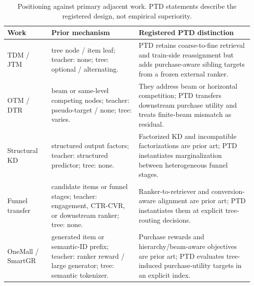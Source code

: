 \begin{table}[!t]
\caption{Positioning against primary adjacent work. PTD statements describe the registered design, not empirical superiority.}
\label{tab:related}
\small
\begin{tabularx}{\textwidth}{l X X}
\toprule
Work & Prior mechanism & Registered PTD distinction \\
\midrule
TDM / JTM~\cite{zhu2018tdm,zhu2019jtm} & tree node / item leaf; teacher: none; tree: optional / alternating. & PTD retains coarse-to-fine retrieval and train-side reassignment but adds purchase-aware sibling targets from a frozen external ranker. \\
OTM / DTR~\cite{zhuo2020otm,liu2024dtr} & beam or same-level competing nodes; teacher: pseudo-target / none; tree: varies. & They address beam or horizontal competition; PTD transfers downstream purchase utility and treats finite-beam mismatch as residual. \\
Structural KD~\cite{wang2021structural} & structured output factors; teacher: structured predictor; tree: none. & Factorized KD and incompatible factorizations are prior art; PTD instantiates marginalization between heterogeneous funnel stages. \\
Funnel transfer~\cite{zhao2021dmtl,huang2023corr,yi2024dmmp,zheng2024fsltr,tencent2025recall} & candidate items or funnel stages; teacher: engagement, CTR-CVR, or downstream ranker; tree: none. & Ranker-to-retriever and conversion-aware alignment are prior art; PTD instantiates them at explicit tree-routing decisions. \\
OneMall / SmartGR~\cite{zhang2026onemall,yang2026bear,yu2026apao,zhang2026smartgr} & generated item or semantic-ID prefix; teacher: ranker reward / large generator; tree: semantic tokenizer. & Purchase rewards and hierarchy/beam-aware objectives are prior art; PTD evaluates tree-induced purchase-utility targets in an explicit index. \\
\bottomrule
\end{tabularx}
\end{table}
